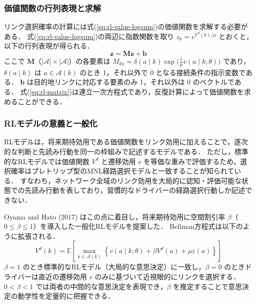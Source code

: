 \subsubsection{価値関数の行列表現と求解}
リンク選択確率の計算には式(\ref{eq:rl-value-logsum})の価値関数を求解する必要がある．
式(\ref{eq:rl-value-logsum})の両辺に指数関数を取り $z_k = e^{V^d(k)/\mu}$ とおくと，以下の行列表現が得られる．
\begin{equation}\label{eq:rl-matrix}
  \bm{z} = \bm{M}\bm{z} + \bm{b}
\end{equation}
ここで $\bm{M}$（$|\mathcal{A}| \times |\mathcal{A}|$）の各要素は $M_{ka} = \delta(a \mid k) \exp\bigl(\frac{1}{\mu} v(a \mid k; \theta)\bigr)$ であり，$\delta(a \mid k)$ は $a \in \mathcal{A}(k)$ のとき 1，それ以外で 0 となる接続条件の指示変数である．
$\bm{b}$ は目的地リンクに対応する要素のみ 1，それ以外は 0 のベクトルである．
式(\ref{eq:rl-matrix})は連立一次方程式であり，反復計算によって価値関数を求めることができる．

\subsubsection{RLモデルの意義と一般化}
RLモデルは，将来期待効用である価値関数をリンク効用に加えることで，逐次的な判断と先読み行動を同一の枠組みで記述するモデルである．
ただし，標準的なRLモデルでは価値関数 $V^d$ と遷移効用 $v$ を等価な重みで評価するため，選択確率はプレトリップ型のMNL経路選択モデルと一致することが知られている．
すなわち，ネットワーク全域のリンク効用を大局的に認知・評価可能な状態での先読み行動を表しており，習慣的なドライバーの経路選択行動しか記述できない．

Oyama and Hato (2017) \cite{Oyama2017dRLeng} はこの点に着目し，将来期待効用に空間割引率 $\beta$（$0 \leq \beta \leq 1$）を導入した一般化RLモデルを提案した．
Bellman方程式は以下のように拡張される．
\begin{equation}\label{eq:grl-bellman}
  V^d(k) = \mathbb{E}\left[\max_{a \in \mathcal{A}(k)} \left\{ v(a \mid k; \theta) + \beta V^d(a) + \mu \varepsilon(a) \right\} \right]
\end{equation}
$\beta = 1$ のとき標準的なRLモデル（大局的な意思決定）に一致し，$\beta = 0$ のときドライバーは直近の遷移効用 $v$ のみに基づいて近視眼的にリンクを選択する．
$0 < \beta < 1$ では両者の中間的な意思決定を表現でき，$\beta$ を推定することで意思決定の動学性を定量的に把握できる．
